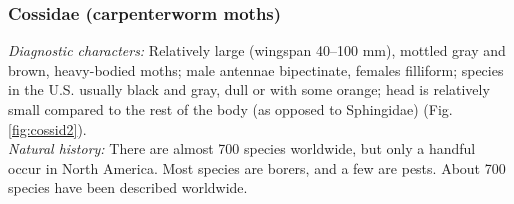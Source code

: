 \documentclass[letterpaper, 11pt]{article}
\begin{document}
\subsubsection{Cossidae (carpenterworm moths)}
\noindent{}\textit{Diagnostic characters:} Relatively large (wingspan 40--100 mm), mottled gray and brown, heavy-bodied moths; male antennae bipectinate, females filliform; species in the U.S. usually black and gray, dull or with some orange; head is relatively small compared to the rest of the body (as opposed to Sphingidae) (Fig. \ref{fig:cossid2}).\\

\noindent{}\textit{Natural history:} There are almost 700 species worldwide, but only a handful occur in North America. Most species are borers, and a few are pests. About 700 species have been described worldwide.
\end{document}

